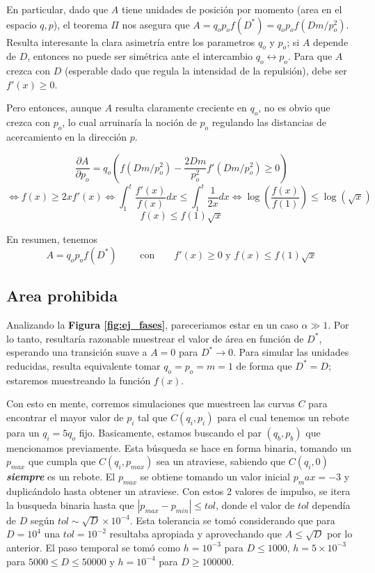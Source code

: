 \documentclass[twoside, 12pt]{article}
\providecommand{\dpart}[2]{\frac{\partial#1}{\partial#2}}
\begin{document}
En particular, dado que $A$ tiene unidades de posición por momento (area en el espacio $q,p$), el teorema $\Pi$ nos asegura que $A = q_op_o f(D^*) = q_op_o f(Dm/p_o^2)$.
Resulta interesante la clara asimetría entre los parametros $q_o$ y $p_o$; si $A$ depende de $D$, entonces no puede ser simétrica ante el intercambio $q_o \leftrightarrow p_o$.
Para que $A$ crezca con $D$ (esperable dado que regula la intensidad de la repulsión), debe ser $f'(x)\geq 0$.

Pero entonces, aunque $A$ resulta claramente creciente en $q_o$, no es obvio que crezca con $p_o$, lo cual arruinaría la noción de $p_o$ regulando las distancias de acercamiento en la dirección $p$.

\[ \dpart{A}{p_o} = q_o\left( f(Dm/p_o^2) - \frac{2Dm}{p_o^2}f'(Dm/p_o^2) \geq 0 \right) \]
\[ \Longleftrightarrow f(x) \geq 2x f'(x) \Longleftrightarrow  \int_1^t \frac{f'(x)}{f(x)}dx \leq \int_1^t\frac{1}{2x}dx \Longleftrightarrow \log{\left(\frac{f(x)}{f(1)}\right)} \leq \log{(\sqrt{x})} \]
\[ f(x) \leq f(1) \sqrt{x}\]

En resumen, tenemos 
\[A = q_op_of(D^*) \qquad \text{ con} \qquad f'(x)\geq 0 \text{ y } f(x)\leq f(1)\sqrt{x} \]


\subsection{Area prohibida}

Analizando la \textbf{Figura \ref{fig:ej_fases}}, pareceriamos estar en un caso $\alpha \gg 1$.
Por lo tanto, resultaría razonable muestrear el valor de área en función de $D^*$, esperando una transición suave a $A=0$ para $D^* \rightarrow 0$.
Para simular las unidades reducidas, resulta equivalente tomar $q_o = p_o = m = 1$ de forma que $D^* = D$; estaremos muestreando la función $f(x)$.

Con esto en mente, corremos simulaciones que muestreen las curvas $C$ para encontrar el mayor valor de $p_i$ tal que $C(q_i, p_i)$ para el cual tenemos un rebote para un $q_i=5q_o$ fijo.
Basicamente, estamos buscando el par $(q_b, p_b)$ que mencionamos previamente.
Esta búsqueda se hace en forma binaria, tomando un $p_{max}$ que cumpla que $C(q_i, p_{max})$ sea un atraviese, sabiendo que $C(q_i, 0)$ \textbf{\textit{siempre}} es un rebote. 
El $p_{max}$ se obtiene tomando un valor inicial $p_max = -3$ y duplicándolo hasta obtener un atraviese.
Con estos 2 valores de impulso, se itera la busqueda binaria hasta que $|p_{max}-p_{min}|\leq tol$, donde el valor de $tol$ dependía de $D$ según $tol \sim \sqrt{D}\times 10^{-4}$.
Esta tolerancia se tomó considerando que para $D=10^4$ una $tol = 10^{-2}$ resultaba apropiada y aprovechando que $A\leq \sqrt{D}$ por lo anterior.
El paso temporal se tomó como $h=10^{-3}$ para $D\leq 1000$, $h=5\times10^{-3}$ para $5000\leq D\leq 50000$ y $h=10^{-4}$ para $D\geq 100000$.
\end{document}
